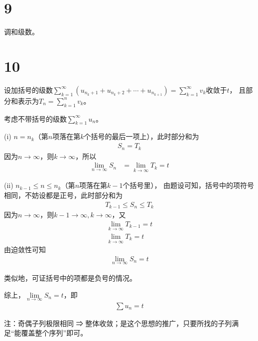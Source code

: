 \documentclass{article}
\begin{document}
\section*{9}

调和级数。

\section*{10}

设加括号的级数$\sum\limits_{k=1}^{\infty} (u_{n_k + 1} + u_{n_k + 2} + \cdots + u_{n_{k + 1}}) = \sum\limits_{k=1}^{\infty} v_k$收敛于$t$，
且部分和表示为$T_n = \sum\limits_{k=1}^{n} v_k$。

考虑不带括号的级数$\sum\limits_{k=1}^{\infty} u_n$。

(i) $n = n_k$（第$n$项落在第$k$个括号的最后一项上），此时部分和为
\begin{align*}
  S_n = T_{k}
\end{align*}
因为$n \to \infty$，则$k \to \infty$，所以
\begin{align*}
  \lim\limits_{n \to \infty} S_n
   & = \lim\limits_{k \to \infty} T_{k} = t
\end{align*}

(ii) $n_{k-1} \leq n \leq n_k$（第$n$项落在第$k - 1$个括号里），
由题设可知，括号中的项符号相同，不妨设都是正号，此时部分和为
\begin{align*}
  T_{k - 1} \leq S_n \leq T_k
\end{align*}
因为$n \to \infty$，则$k - 1 \to \infty, k \to \infty$，又
\begin{align*}
  \lim\limits_{k \to \infty} T_{k-1} = t \\
  \lim\limits_{k \to \infty} T_{k} = t
\end{align*}
由迫敛性可知
\begin{align*}
  \lim\limits_{n \to \infty} S_n = t
\end{align*}

类似地，可证括号中的项都是负号的情况。

综上，$\lim\limits_{n \to \infty} S_n = t$，即
\begin{align*}
  \sum u_n = t
\end{align*}

注：奇偶子列极限相同 ⇒ 整体收敛；是这个思想的推广，只要所找的子列满足“能覆盖整个序列”即可。
\end{document}
